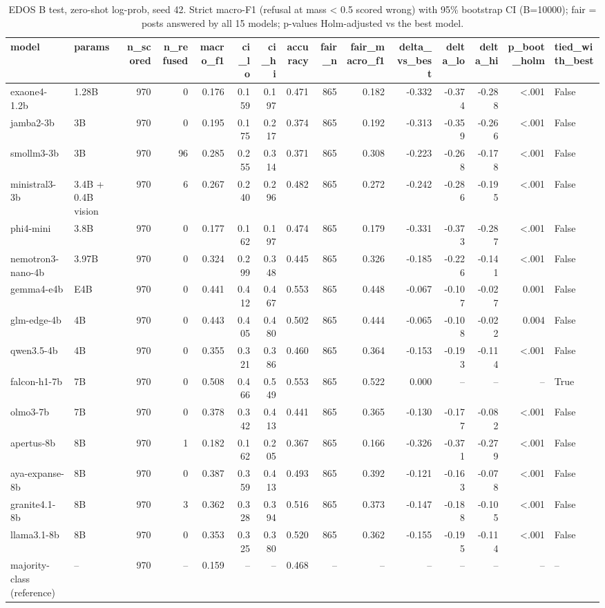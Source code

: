 \begin{table}[t]
\caption{EDOS B test, zero-shot log-prob, seed 42. Strict macro-F1 (refusal at mass < 0.5 scored wrong) with 95\% bootstrap CI (B=10000); fair = posts answered by all 15 models; p-values Holm-adjusted vs the best model.}
\label{tab:main_edos_task_b}
\begin{tabular}{llrrrrrrrrrrrrl}
\toprule
model & params & n_scored & n_refused & macro_f1 & ci_lo & ci_hi & accuracy & fair_n & fair_macro_f1 & delta_vs_best & delta_lo & delta_hi & p_boot_holm & tied_with_best \\
\midrule
exaone4-1.2b & 1.28B & 970 & 0 & 0.176 & 0.159 & 0.197 & 0.471 & 865 & 0.182 & -0.332 & -0.374 & -0.288 & <.001 & False \\
jamba2-3b & 3B & 970 & 0 & 0.195 & 0.175 & 0.217 & 0.374 & 865 & 0.192 & -0.313 & -0.359 & -0.266 & <.001 & False \\
smollm3-3b & 3B & 970 & 96 & 0.285 & 0.255 & 0.314 & 0.371 & 865 & 0.308 & -0.223 & -0.268 & -0.178 & <.001 & False \\
ministral3-3b & 3.4B + 0.4B vision & 970 & 6 & 0.267 & 0.240 & 0.296 & 0.482 & 865 & 0.272 & -0.242 & -0.286 & -0.195 & <.001 & False \\
phi4-mini & 3.8B & 970 & 0 & 0.177 & 0.162 & 0.197 & 0.474 & 865 & 0.179 & -0.331 & -0.373 & -0.287 & <.001 & False \\
nemotron3-nano-4b & 3.97B & 970 & 0 & 0.324 & 0.299 & 0.348 & 0.445 & 865 & 0.326 & -0.185 & -0.226 & -0.141 & <.001 & False \\
gemma4-e4b & E4B & 970 & 0 & 0.441 & 0.412 & 0.467 & 0.553 & 865 & 0.448 & -0.067 & -0.107 & -0.027 & 0.001 & False \\
glm-edge-4b & 4B & 970 & 0 & 0.443 & 0.405 & 0.480 & 0.502 & 865 & 0.444 & -0.065 & -0.108 & -0.022 & 0.004 & False \\
qwen3.5-4b & 4B & 970 & 0 & 0.355 & 0.321 & 0.386 & 0.460 & 865 & 0.364 & -0.153 & -0.193 & -0.114 & <.001 & False \\
falcon-h1-7b & 7B & 970 & 0 & 0.508 & 0.466 & 0.549 & 0.553 & 865 & 0.522 & 0.000 & -- & -- & -- & True \\
olmo3-7b & 7B & 970 & 0 & 0.378 & 0.342 & 0.413 & 0.441 & 865 & 0.365 & -0.130 & -0.177 & -0.082 & <.001 & False \\
apertus-8b & 8B & 970 & 1 & 0.182 & 0.162 & 0.205 & 0.367 & 865 & 0.166 & -0.326 & -0.371 & -0.279 & <.001 & False \\
aya-expanse-8b & 8B & 970 & 0 & 0.387 & 0.359 & 0.413 & 0.493 & 865 & 0.392 & -0.121 & -0.163 & -0.078 & <.001 & False \\
granite4.1-8b & 8B & 970 & 3 & 0.362 & 0.328 & 0.394 & 0.516 & 865 & 0.373 & -0.147 & -0.188 & -0.105 & <.001 & False \\
llama3.1-8b & 8B & 970 & 0 & 0.353 & 0.325 & 0.380 & 0.520 & 865 & 0.362 & -0.155 & -0.195 & -0.114 & <.001 & False \\
majority-class (reference) & -- & 970 & -- & 0.159 & -- & -- & 0.468 & -- & -- & -- & -- & -- & -- & -- \\
\bottomrule
\end{tabular}
\end{table}
